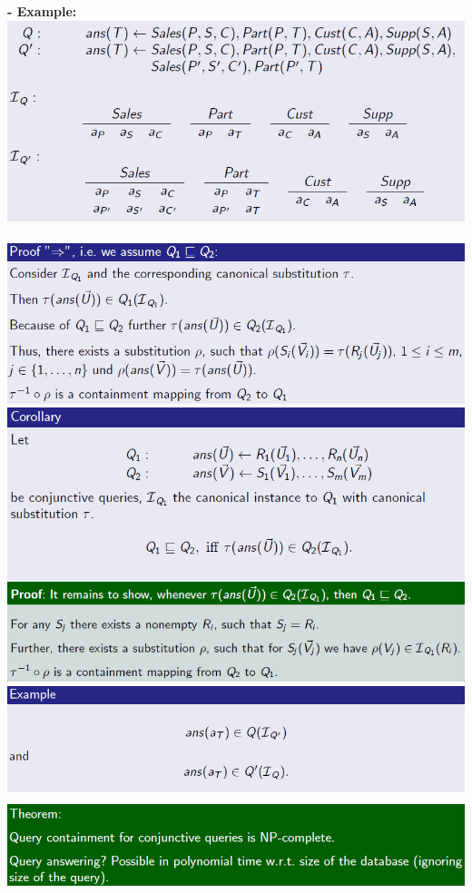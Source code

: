 \documentclass{article}
\begin{document}
\textbf{- Example: }\\
\includegraphics[scale=0.6]{65.png}\\\\
\includegraphics[scale=0.6]{66.png}\\
\includegraphics[scale=0.6]{67.png}\\
\includegraphics[scale=0.6]{68.png}
\end{document}
